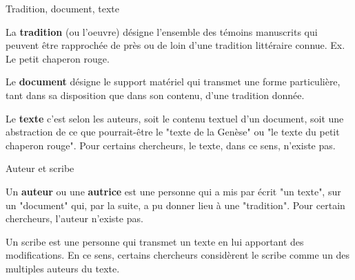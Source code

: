 \documentclass[11pt]{beamer}
\begin{document}
\begin{frame}{Tradition, document, texte}

    \begin{definition}
        La \textbf{tradition} (ou l'oeuvre) désigne l'ensemble des témoins manuscrits qui peuvent être rapprochée de près ou de loin d'une tradition littéraire connue. Ex. Le petit chaperon rouge. 
    \end{definition}
    
    \begin{definition}
        Le \textbf{document} désigne le support matériel qui transmet une forme particulière, tant dans sa disposition que dans son contenu, d'une tradition donnée. 
    \end{definition}
    
    \begin{definition}
        Le \textbf{texte} c'est selon les auteurs, soit le contenu textuel d'un document, soit une abstraction de ce que pourrait-être le "texte de la Genèse" ou "le texte du petit chaperon rouge". Pour certains chercheurs, le texte, dans ce sens, n'existe pas. 
    \end{definition}

\end{frame}

\begin{frame}{Auteur et scribe}

\begin{definition}
    Un \textbf{auteur} ou une \textbf{autrice} est une personne qui a mis par écrit "un texte", sur un "document" qui, par la suite, a pu donner lieu à une "tradition". Pour certain chercheurs, l'auteur n'existe pas.
\end{definition}

\begin{definition}
    Un scribe est une personne qui transmet un texte en lui apportant des modifications. En ce sens, certains chercheurs considèrent le scribe comme un des multiples auteurs du texte.
\end{definition}
    
\end{frame}
\end{document}
